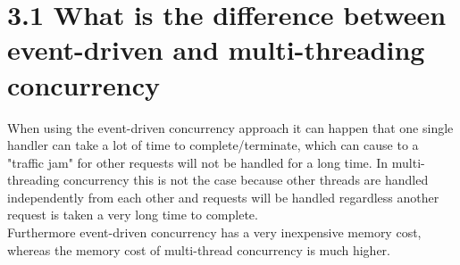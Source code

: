 \documentclass{article}
\begin{document}
	\pagestyle{fancy}
	\hfill
	
	\section*{3.1 What is the difference between event-driven and multi-threading concurrency}
	\begin{adjustwidth}{2em}{2em}
		When using the event-driven concurrency approach it can happen that one single handler can take a lot of time to complete/terminate, which can cause to a "traffic jam" for other requests will not be handled for a long time. In multi-threading concurrency this is not the case because other threads are handled independently from each other and requests will be handled regardless another request is taken a very long time to complete. \\
		Furthermore event-driven concurrency has a very inexpensive memory cost, whereas the memory cost of multi-thread concurrency is much higher.
	\end{adjustwidth}
	
\end{document}
